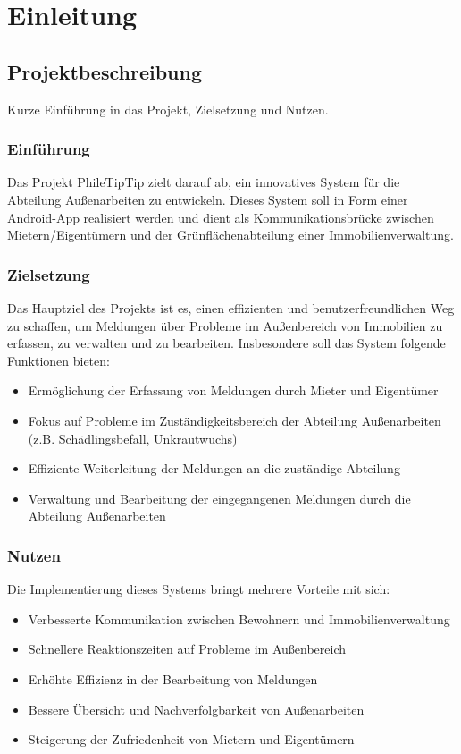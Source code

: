 \section{Einleitung}
\subsection{Projektbeschreibung}
Kurze Einführung in das Projekt, Zielsetzung und Nutzen.

\subsubsection{Einführung}

Das Projekt PhileTipTip zielt darauf ab, ein innovatives System für die Abteilung Außenarbeiten zu entwickeln. Dieses System soll in Form einer Android-App realisiert werden und dient als Kommunikationsbrücke zwischen Mietern/Eigentümern und der Grünflächenabteilung einer Immobilienverwaltung.

\subsubsection{Zielsetzung}

Das Hauptziel des Projekts ist es, einen effizienten und benutzerfreundlichen Weg zu schaffen, um Meldungen über Probleme im Außenbereich von Immobilien zu erfassen, zu verwalten und zu bearbeiten. Insbesondere soll das System folgende Funktionen bieten:
\begin{itemize}
  \item  Ermöglichung der Erfassung von Meldungen durch Mieter und Eigentümer
  \item  Fokus auf Probleme im Zuständigkeitsbereich der Abteilung Außenarbeiten (z.B. Schädlingsbefall, Unkrautwuchs)
  \item  Effiziente Weiterleitung der Meldungen an die zuständige Abteilung
  \item  Verwaltung und Bearbeitung der eingegangenen Meldungen durch die Abteilung Außenarbeiten
\end{itemize}

\subsubsection{Nutzen}

Die Implementierung dieses Systems bringt mehrere Vorteile mit sich:
\begin{itemize}
  \item  Verbesserte Kommunikation zwischen Bewohnern und Immobilienverwaltung
  \item  Schnellere Reaktionszeiten auf Probleme im Außenbereich
  \item  Erhöhte Effizienz in der Bearbeitung von Meldungen
  \item  Bessere Übersicht und Nachverfolgbarkeit von Außenarbeiten
  \item  Steigerung der Zufriedenheit von Mietern und Eigentümern
\end{itemize}

